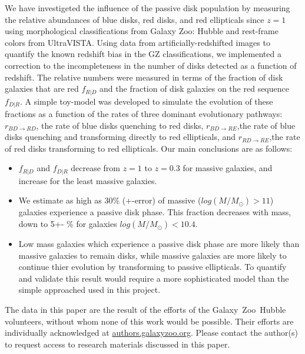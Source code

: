 \documentclass[useAMS,usenatbib]{mn2e}
\begin{document}
We have investigeted the influence of the passive disk population by measuring the relative abundances of blue disks, red disks, and red ellipticals since $z=1$ using morphological classifications from Galaxy Zoo: Hubble and rest-frame colors from UltraVISTA. Using data from artificially-redshifted  images to quantify the known redshift bias in the GZ classifications, we implemented a correction to the incompleteness in the number of disks detected as a function of redshift. The relative numbers were measured in terms of the fraction of disk galaxies that are red $f_{R|D}$ and the fraction of disk galaxies on the red sequence $f_{D|R}$. A simple toy-model was developed to simulate the evolution of these fractions as a function of the rates of three dominant evolutionary pathways: $r_{BD \rightarrow RD}$, the rate of blue disks quenching to red disks, $r_{BD \rightarrow RE}$,the rate of blue disks quenching and transforming directly to red ellipticals, and $r_{RD \rightarrow RE}$,the rate of red disks transforming to red ellipticals. Our main conclusions are as follows:

\begin{itemize}

\item{$f_{R|D}$ and $f_{D|R}$ decrease from $z=1$ to $z=0.3$ for massive galaxies, and increase for the least massive galaxies.}

\item{We estimate as high as 30\% (+-error) of massive ($log(M/M_{\odot})>11$) galaxies experience a passive disk phase. This fraction decreases with mass, down to 5+- \% for galaxies $log(M/M_{\odot})<10.4$.}

\item{Low mass galaxies which experience a passive disk phase are more likely than massive galaxies to remain disks, while massive galaxies are more likely to continue thier evolution by transforming to passive ellipticals. To quantify and validate this result would require a more sophisticated model than the simple approached used in this project.}


\end{itemize}





The data in this paper are the result of the efforts of the Galaxy~Zoo~Hubble volunteers, without whom none of this work would be possible. Their efforts are individually acknowledged at \url{authors.galaxyzoo.org}. Please contact the author(s) to request access to research materials discussed in this paper. 
\end{document}
